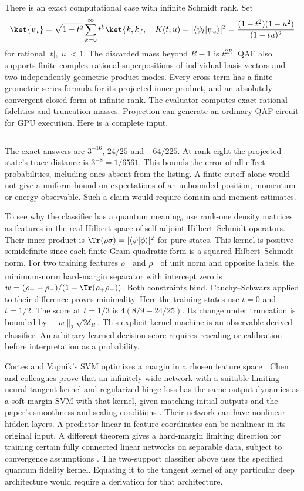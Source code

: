 There is an exact computational case with infinite Schmidt rank. Set
\[
 \ket{\psi_t}=\sqrt{1-t^2}\sum_{k=0}^{\infty}t^k\ket{k,k},\quad
 K(t,u)=|\langle\psi_t|\psi_u\rangle|^2
       ={(1-t^2)(1-u^2)\over(1-tu)^2}
\]
for rational $|t|,|u|<1$. The discarded mass beyond $R-1$ is $t^{2R}$. QAF also supports finite complex rational superpositions of individual basis vectors and two independently geometric product modes. Every cross term has a finite geometric-series formula for its projected inner product, and an absolutely convergent closed form at infinite rank. The evaluator computes exact rational fidelities and truncation masses. Projection can generate an ordinary QAF circuit for GPU execution. Here is a complete input.
\inputminted{qaf}{examples/prefix/hilbert.qaf}
The exact answers are $3^{-16}$, $24/25$ and $-64/225$. At rank eight the projected state's trace distance is $3^{-8}=1/6561$. This bounds the error of all effect probabilities, including ones absent from the listing. A finite cutoff alone would not give a uniform bound on expectations of an unbounded position, momentum or energy observable. Such a claim would require domain and moment estimates.

To see why the classifier has a quantum meaning, use rank-one density matrices as features in the real Hilbert space of self-adjoint Hilbert--Schmidt operators. Their inner product is $\Tr(\rho\sigma)=|\langle\psi|\phi\rangle|^2$ for pure states. This kernel is positive semidefinite since each finite Gram quadratic form is a squared Hilbert--Schmidt norm. For two training features $\rho_+$ and $\rho_-$ of unit norm and opposite labels, the minimum-norm hard-margin separator with intercept zero is $w=(\rho_+-\rho_-)/(1-\Tr(\rho_+\rho_-))$. Both constraints bind. Cauchy--Schwarz applied to their difference proves minimality. Here the training states use $t=0$ and $t=1/2$. The score at $t=1/3$ is $4(8/9-24/25)$. Its change under truncation is bounded by $\|w\|_2\sqrt{2\delta_R}$. This explicit kernel machine is an observable-derived classifier. An arbitrary learned decision score requires rescaling or calibration before interpretation as a probability.

Cortes and Vapnik's SVM optimizes a margin in a chosen feature space \cite{svm}. Chen and colleagues prove that an infinitely wide network with a suitable limiting neural tangent kernel and regularized hinge loss has the same output dynamics as a soft-margin SVM with that kernel, given matching initial outputs and the paper's smoothness and scaling conditions \cite{chen,ntk}. Their network can have nonlinear hidden layers. A predictor linear in feature coordinates can be nonlinear in its original input. A different theorem gives a hard-margin limiting direction for training certain fully connected linear networks on separable data, subject to convergence assumptions \cite{gunasekar}. The two-support classifier above uses the specified quantum fidelity kernel. Equating it to the tangent kernel of any particular deep architecture would require a derivation for that architecture.

